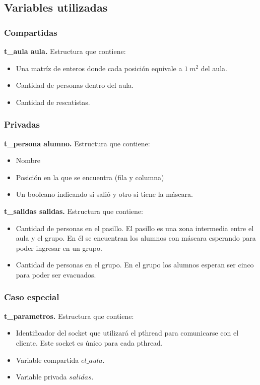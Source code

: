 \subsection{Variables utilizadas}
\subsubsection{Compartidas}
\textbf{t\_aula aula.}
Estructura que contiene: 
\begin{itemize}
 \item Una matríz de enteros donde cada posición equivale a $1\ m^{2}$ del aula.
 \item Cantidad de personas dentro del aula.
 \item Cantidad de rescatístas.
\end{itemize}

\subsubsection{Privadas}
\textbf{t\_persona alumno.}
Estructura que contiene: 
\begin{itemize}
 \item Nombre
 \item Posición en la que se encuentra (fila y columna)
 \item Un booleano indicando si salió y otro si tiene la máscara.
\end{itemize}

\smallskip
\textbf{t\_salidas salidas.}
Estructura que contiene: 
\begin{itemize}
 \item Cantidad de personas en el pasillo. 
 El pasillo es una zona intermedia entre el aula y el grupo. En él se encuentran 
 los alumnos con máscara esperando para poder ingresar en un grupo.
 \item Cantidad de personas en el grupo. 
 En el grupo los alumnos esperan ser cinco para poder ser evacuados.
\end{itemize}

\subsubsection{Caso especial}
\textbf{t\_parametros.} 
Estructura que contiene: 
\begin{itemize}
 \item Identificador del socket que utilizará el pthread para comunicarse con el cliente.
 Este socket es único para cada pthread.
 \item Variable compartida $el\_ aula$.
 \item Variable privada $salidas$.
\end{itemize}

